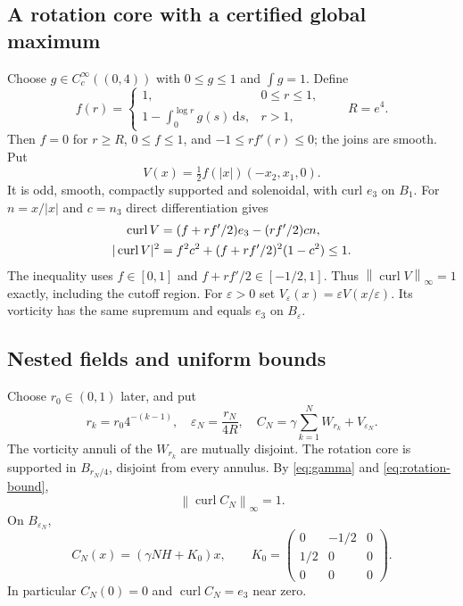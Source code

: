 \documentclass[11pt]{article}
\theoremstyle{remark}
\newcommand{\curl}{\operatorname{curl}}
\newcommand{\norm}[1]{\left\lVert#1\right\rVert}
\newcommand{\dd}{\,\mathrm d}
\begin{document}
\subsection{A rotation core with a certified global maximum}
Choose $g\in C_c^\infty((0,4))$ with $0\le g\le1$ and
$\int g=1$. Define
\begin{equation}
 f(r)=\begin{cases}
  1,&0\le r\le1,\\
  1-\displaystyle\int_0^{\log r}g(s)\dd s,&r>1,
 \end{cases}
 \qquad R=e^4.
\end{equation}
Then $f=0$ for $r\ge R$, $0\le f\le1$, and $-1\le rf'(r)\le0$;
the joins are smooth. Put
\begin{equation}
 V(x)=\tfrac12 f(|x|)(-x_2,x_1,0).\label{eq:rotation}
\end{equation}
It is odd, smooth, compactly supported and solenoidal, with curl $e_3$ on
$B_1$. For $n=x/|x|$ and $c=n_3$ direct differentiation gives
\begin{align}
 \curl V&=(f+rf'/2)e_3-(rf'/2)c n,\notag\\
 |\curl V|^2&=f^2c^2+(f+rf'/2)^2(1-c^2)\le1.\label{eq:rotation-bound}
\end{align}
The inequality uses $f\in[0,1]$ and $f+rf'/2\in[-1/2,1]$.
Thus $\norm{\curl V}_\infty=1$ exactly, including the cutoff region.
For $\varepsilon>0$ set
$V_\varepsilon(x)=\varepsilon V(x/\varepsilon)$. Its vorticity has the
same supremum and equals $e_3$ on $B_\varepsilon$.

\subsection{Nested fields and uniform bounds}
Choose $r_0\in(0,1)$ later, and put
\begin{equation}
 r_k=r_0 4^{-(k-1)},\quad
 \varepsilon_N=\frac{r_N}{4R},\quad
 C_N=\gamma\sum_{k=1}^N W_{r_k}+V_{\varepsilon_N}.
 \label{eq:central}
\end{equation}
The vorticity annuli of the $W_{r_k}$ are mutually disjoint.
The rotation core is supported in $B_{r_N/4}$, disjoint from every annulus.
By \eqref{eq:gamma} and \eqref{eq:rotation-bound},
\begin{equation}
 \norm{\curl C_N}_\infty=1.
\end{equation}
On $B_{\varepsilon_N}$,
\begin{equation}
 C_N(x)=(\gamma N H+K_0)x,\qquad
 K_0=\begin{pmatrix}0&-1/2&0\\1/2&0&0\\0&0&0\end{pmatrix}.
 \label{eq:affine-core}
\end{equation}
In particular $C_N(0)=0$ and $\curl C_N=e_3$ near zero.
\end{document}
